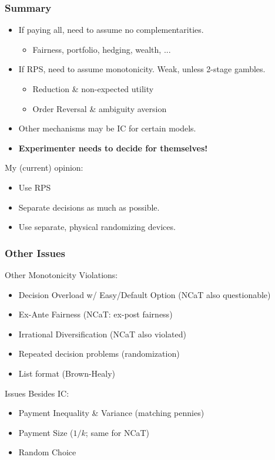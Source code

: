 \begin{frame}
  \frametitle{Summary}
  \begin{itemize}
    \item If paying all, need to assume no complementarities.
    \begin{itemize}
      \item Fairness, portfolio, hedging, wealth, ...
    \end{itemize}
    \item If RPS, need to assume monotonicity. Weak, unless 2-stage gambles.
    \begin{itemize}
      \item Reduction \& non-expected utility
      \item Order Reversal \& ambiguity aversion
    \end{itemize}
    \item Other mechanisms may be IC for certain models.
    \item \textbf{Experimenter needs to decide for themselves!}
  \end{itemize}

  \bigskip

  My (current) opinion:
  \begin{itemize}
    \item Use RPS
    \item Separate decisions as much as possible.
    \item Use separate, physical randomizing devices.
  \end{itemize}
\end{frame}

\begin{frame}
  \frametitle{Other Issues}
  Other Monotonicity Violations:
  \begin{itemize}
    \item Decision Overload w/ Easy/Default Option (NCaT also questionable)
    \item Ex-Ante Fairness (NCaT: ex-post fairness)
    \item Irrational Diversification (NCaT also violated)
    \item Repeated decision problems (randomization)
    \item List format (Brown-Healy)
  \end{itemize}

  \bigskip

  Issues Besides IC:
  \begin{itemize}
    \item Payment Inequality \& Variance (matching pennies)
    \item Payment Size ($1/k$; same for NCaT)
    \item Random Choice
  \end{itemize}
  \bigskip
\end{frame}


